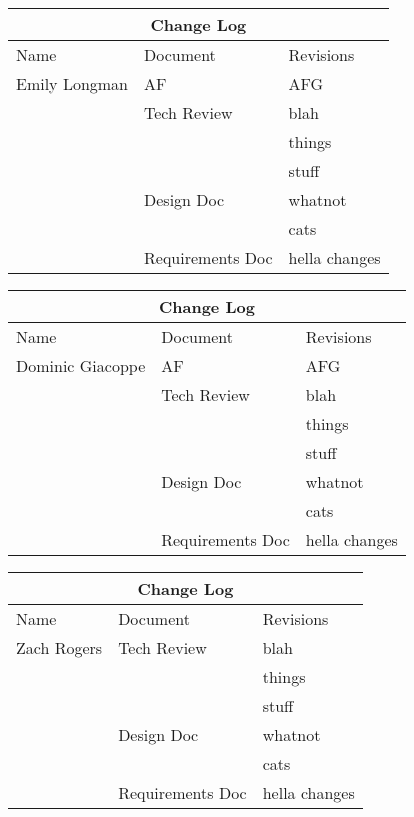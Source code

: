\documentclass[IEEEtran,letterpaper,10pt,titlepage,draftclsnofoot,onecolumn]{article}
\begin{document}
\begin{tabular}{ |p{3cm}|p{3cm}|p{3cm}|  }
\hline
\multicolumn{3}{|c|}{Change Log} \\
\hline
Name & Document & Revisions \\
\hline
Emily Longman & AF &AFG \\
& Tech Review & blah \\
& & things \\
& & stuff \\
& Design Doc & whatnot \\
& & cats \\
& Requirements Doc & hella changes \\
\hline
\end{tabular}

\begin{tabular}{ |p{3cm}|p{3cm}|p{3cm}|  }
\hline
\multicolumn{3}{|c|}{Change Log} \\
\hline
Name & Document & Revisions \\
\hline
Dominic Giacoppe & AF &AFG \\
& Tech Review & blah \\
& & things \\
& & stuff \\
& Design Doc & whatnot \\
& & cats \\
& Requirements Doc & hella changes \\
\hline
\end{tabular}

\begin{tabular}{ |p{3cm}|p{3cm}|p{3cm}|  }
\hline
\multicolumn{3}{|c|}{Change Log} \\
\hline
Name & Document & Revisions \\
\hline
Zach Rogers & Tech Review & blah \\
& & things \\
& & stuff \\
& Design Doc & whatnot \\
& & cats \\
& Requirements Doc & hella changes \\
\hline
\end{tabular}
\end{document}
